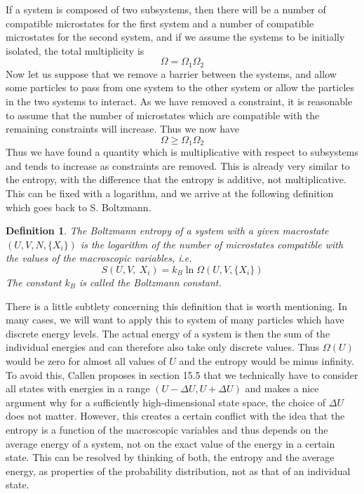 \documentclass[a4paper, draft]{article}
\theoremstyle{own}
\newtheorem{defn}{Definition}[section]
\theoremstyle{remark}
\begin{document}
If a system is composed of two subsystems, then there will be a number of compatible microstates for the first system and a number of compatible microstates for the second system, and if we assume the systems to be initially isolated, the total multiplicity is
$$
\Omega = \Omega_1 \Omega_2
$$
Now let us suppose that we remove a barrier between the systems, and allow some particles to pass from one system to the other system or allow the particles in the two systems to interact. As we have removed a constraint, it is reasonable to assume that the number of microstates which are compatible with the remaining constraints will increase. Thus we now have
$$
\Omega \geq \Omega_1 \Omega_2
$$
Thus we have found a quantity which is multiplicative with respect to subsystems and tends to increase as constraints are removed. This is already very similar to the entropy, with the difference that the entropy is additive, not multiplicative. This can be fixed with a logarithm, and we arrive at the following definition which goes back to S. Boltzmann.

\begin{defn}
The {\em Boltzmann entropy} of a system with a given macrostate $(U,V,N, \{X_i\})$ is the logarithm of the number of microstates compatible with the values of the macroscopic variables, i.e.
$$
S(U,V,{\ X_i}) = k_B \ln \Omega(U,V,\{ X_i\})
$$
The constant $k_B$ is called the {\em Boltzmann constant}.
\end{defn}

There is a little subtlety concerning this definition that is worth mentioning. In many cases, we will want to apply this to system of many particles which have discrete energy levels. The actual energy of a system is then the sum of the individual energies and can therefore also take only discrete values. Thus $\Omega(U)$ would be zero for almost all values of $U$ and the entropy would be minus infinity. To avoid this, Callen proposes in \cite{Callen} section 15.5 that we technically have to consider all states with energies in a range $(U - \Delta U, U + \Delta U)$ and makes a nice argument why for a sufficiently high-dimensional state space, the choice of $\Delta U$ does not matter. However, this creates a certain conflict with the idea that the entropy is a function of the macroscopic variables and thus depends on the average energy of a system, not on the exact value of the energy in a certain state. This can be resolved by thinking of both, the entropy and the average energy, as properties of the probability distribution, not as that of an individual state.
\end{document}
